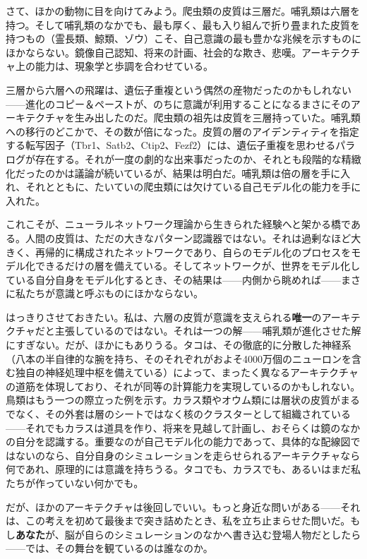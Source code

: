 \documentclass[11pt, twoside, openright]{book}
\begin{document}
さて、ほかの動物に目を向けてみよう。爬虫類の皮質は三層だ。哺乳類は六層を持つ。そして哺乳類のなかでも、最も厚く、最も入り組んで折り畳まれた皮質を持つもの（霊長類、鯨類、ゾウ）こそ、自己意識の最も豊かな兆候を示すものにほかならない。鏡像自己認知、将来の計画、社会的な欺き、悲嘆。アーキテクチャ上の能力は、現象学と歩調を合わせている。

三層から六層への飛躍は、遺伝子重複という偶然の産物だったのかもしれない------進化のコピー＆ペーストが、のちに意識が利用することになるまさにそのアーキテクチャを生み出したのだ。爬虫類の祖先は皮質を三層持っていた。哺乳類への移行のどこかで、その数が倍になった。皮質の層のアイデンティティを指定する転写因子（Tbr1、Satb2、Ctip2、Fezf2）には、遺伝子重複を思わせるパラログが存在する。それが一度の劇的な出来事だったのか、それとも段階的な精緻化だったのかは議論が続いているが、結果は明白だ。哺乳類は倍の層を手に入れ、それとともに、たいていの爬虫類には欠けている自己モデル化の能力を手に入れた。

これこそが、ニューラルネットワーク理論から生きられた経験へと架かる橋である。人間の皮質は、ただの大きなパターン認識器ではない。それは過剰なほど大きく、再帰的に構成されたネットワークであり、自らのモデル化のプロセスをモデル化できるだけの層を備えている。そしてネットワークが、世界をモデル化している自分自身をモデル化するとき、その結果は------内側から眺めれば------まさに私たちが意識と呼ぶものにほかならない。

はっきりさせておきたい。私は、六層の皮質が意識を支えられる\textbf{唯一}のアーキテクチャだと主張しているのではない。それは一つの解------哺乳類が進化させた解にすぎない。だが、ほかにもありうる。タコは、その徹底的に分散した神経系（八本の半自律的な腕を持ち、そのそれぞれがおよそ4000万個のニューロンを含む独自の神経処理中枢を備えている）によって、まったく異なるアーキテクチャの道筋を体現しており、それが同等の計算能力を実現しているのかもしれない。鳥類はもう一つの際立った例を示す。カラス類やオウム類には層状の皮質がまるでなく、その外套は層のシートではなく核のクラスターとして組織されている------それでもカラスは道具を作り、将来を見越して計画し、おそらくは鏡のなかの自分を認識する。重要なのが自己モデル化の能力であって、具体的な配線図ではないのなら、自分自身のシミュレーションを走らせられるアーキテクチャなら何であれ、原理的には意識を持ちうる。タコでも、カラスでも、あるいはまだ私たちが作っていない何かでも。

だが、ほかのアーキテクチャは後回しでいい。もっと身近な問いがある------それは、この考えを初めて最後まで突き詰めたとき、私を立ち止まらせた問いだ。もし\textbf{あなた}が、脳が自らのシミュレーションのなかへ書き込む登場人物だとしたら------では、その舞台を観ているのは誰なのか。
\end{document}
